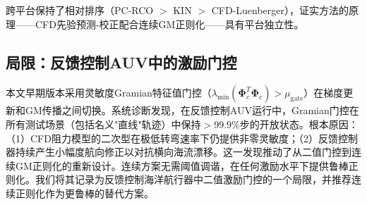 跨平台保持了相对排序（PC-RCO $>$ KIN $>$ CFD-Luenberger），证实方法的原理——CFD先验预测-校正配合连续GM正则化——具有平台独立性。

\subsection{局限：反馈控制AUV中的激励门控}

本文早期版本采用灵敏度Gramian特征值门控（$\lambda_{\min}(\bm{\Phi}_c^T\bm{\Phi}_c) > \mu_{\text{gate}}$）在梯度更新和GM传播之间切换。系统诊断发现，在反馈控制AUV运行中，Gramian门控在所有测试场景（包括名义"直线"轨迹）中保持$>$99.9\%步的开放状态。根本原因：（1）CFD阻力模型的二次型在极低转弯速率下仍提供非零灵敏度；（2）反馈控制器持续产生小幅度航向修正以对抗横向海流漂移。这一发现推动了从二值门控到连续GM正则化的重新设计。连续方案无需阈值调谐，在任何激励水平下提供鲁棒正则化。我们将其记录为反馈控制海洋航行器中二值激励门控的一个局限，并推荐连续正则化作为更鲁棒的替代方案。

